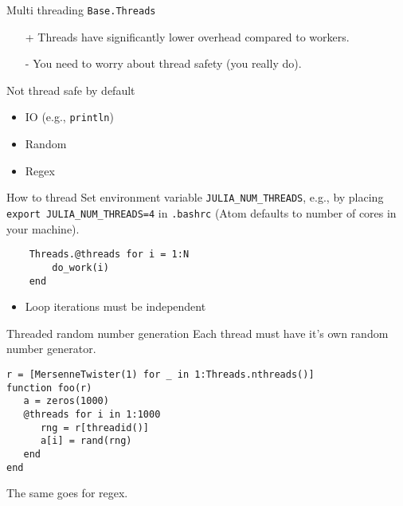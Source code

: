 \documentclass{beamer}
\begin{document}
\begin{frame}{Multi threading}{}
    \texttt{Base.Threads}
    \begin{itemize}
        \item[+] Threads have significantly lower overhead compared to workers.
        \item[-] You need to worry about thread safety (you really do).
    \end{itemize}
\end{frame}

\begin{frame}{Not thread safe by default}{}
    \begin{itemize}
        \item IO (e.g., \texttt{println})
        \item Random
        \item Regex
    \end{itemize}
\end{frame}

\begin{frame}[fragile]{How to thread}{}
    Set environment variable \texttt{JULIA\_NUM\_THREADS}, e.g., by placing \texttt{export JULIA\_NUM\_THREADS=4} in \texttt{.bashrc} (Atom defaults to number of cores in your machine).

    \begin{verbatim}
    Threads.@threads for i = 1:N
        do_work(i)
    end
    \end{verbatim}

    \begin{itemize}
        \item Loop iterations must be independent
    \end{itemize}
\end{frame}


\begin{frame}[fragile]{Threaded random number generation}{}
Each thread must have it's own random number generator.
    \begin{verbatim}
r = [MersenneTwister(1) for _ in 1:Threads.nthreads()]
function foo(r)
   a = zeros(1000)
   @threads for i in 1:1000
      rng = r[threadid()]
      a[i] = rand(rng)
   end
end
    \end{verbatim}
    The same goes for regex.
\end{frame}
\end{document}
